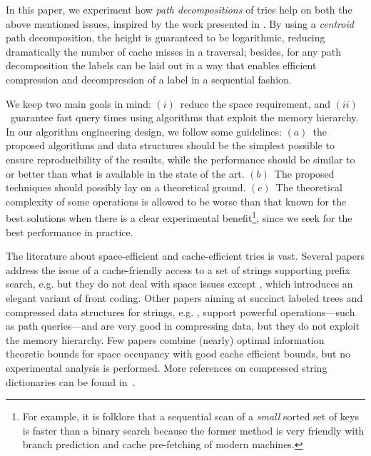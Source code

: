 \documentclass[a4paper,11pt]{article}
\theoremstyle{nonumberplain}
\begin{document}
In this paper, we experiment how \emph{path decompositions} of tries
help on both the above mentioned issues, inspired by the work
presented in \cite{pods08}.  By using a \emph{centroid} path
decomposition, the height is guaranteed to be logarithmic, reducing
dramatically the number of cache misses in a traversal; besides, for
any path decomposition the labels can be laid out in a way that
enables efficient compression and decompression of a label in a
sequential fashion.

We keep two main goals in mind: $(i)$~reduce the space requirement,
and $(ii)$~guarantee fast query times using algorithms that exploit
the memory hierarchy. In our algorithm engineering design, we follow
some guidelines: $(a)$~the proposed algorithms and data structures
should be the simplest possible to ensure reproducibility of the
results, while the performance should be similar to or better than
what is available in the state of the art. $(b)$~The proposed
techniques should possibly lay on a theoretical ground. $(c)$~The theoretical
complexity of some operations is allowed to be worse than that known
for the best solutions when there is a clear experimental
benefit\footnote{For example, it is folklore that a sequential scan of
  a \emph{small} sorted set of keys is faster than a binary search
  because the former method is very friendly with branch prediction
  and cache pre-fetching of modern machines.}, since we seek for the
best performance in practice.

The literature about space-efficient and cache-efficient tries is
vast. Several papers address the issue of a cache-friendly access to a
set of strings supporting prefix search, e.g.\mbox{}
\cite{AcharyaZS99,BenderFK06,BrodalF06,FerraginaGrossi99} but they do
not deal with space issues except \cite{BenderFK06}, which introduces
an elegant variant of front coding. Other papers aiming at succinct
labeled trees and compressed data structures for strings, e.g.\mbox{}
\cite{bpalx10,monotonehash09,dfuds,BlandfordB08,FerraginaLMM09,Munro:2001:SRB,bpsoda10},
support powerful operations---such as path queries---and are very good
in compressing data, but they do not exploit the memory hierarchy. Few
papers \cite{ChiuHSV10,pods08} combine (nearly) optimal information
theoretic bounds for space occupancy with good cache efficient
bounds, but no experimental analysis is performed. More references on compressed string dictionaries can be found
in~\cite{csd11}.
\end{document}
